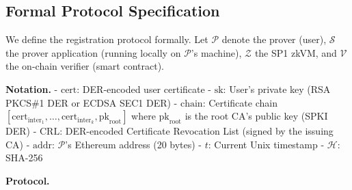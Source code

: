 \documentclass[11pt, a4paper]{article}
\begin{document}
\subsection{Formal Protocol
Specification}\label{formal-protocol-specification}

We define the registration protocol formally. Let \(\mathcal{P}\) denote
the prover (user), \(\mathcal{S}\) the prover application (running locally
on \(\mathcal{P}\)'s machine), \(\mathcal{Z}\) the SP1 zkVM, and
\(\mathcal{V}\) the on-chain verifier (smart contract).

\textbf{Notation.} - \(\text{cert}\): DER-encoded user certificate -
\(\text{sk}\): User's private key (RSA PKCS\#1 DER or ECDSA SEC1 DER) -
\(\text{chain}\): Certificate chain
\([\text{cert}_{\text{inter}_1}, \ldots, \text{cert}_{\text{inter}_k}, \text{pk}_{\text{root}}]\)
where \(\text{pk}_{\text{root}}\) is the root CA's public key (SPKI DER)
- \(\text{CRL}\): DER-encoded Certificate Revocation List (signed by the
issuing CA) - \(\text{addr}\): \(\mathcal{P}\)'s Ethereum address (20
bytes) - \(t\): Current Unix timestamp - \(\mathcal{H}\): SHA-256

\textbf{Protocol.}
\end{document}
